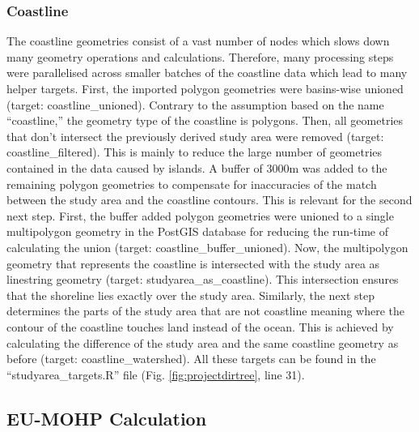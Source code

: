 \documentclass[fleqn,10pt]{wlscirep}
\begin{document}
\hypertarget{coastline}{%
\subsubsection*{Coastline}\label{coastline}}

The coastline geometries consist of a vast number of nodes which slows down many geometry operations and calculations. Therefore, many processing steps were parallelised across smaller batches of the coastline data which lead to many helper targets. First, the imported polygon geometries were basins-wise unioned (target: coastline\_unioned). Contrary to the assumption based on the name ``coastline,'' the geometry type of the coastline is polygons. Then, all geometries that don't intersect the previously derived study area were removed (target: coastline\_filtered). This is mainly to reduce the large number of geometries contained in the data caused by islands. A buffer of 3000m was added to the remaining polygon geometries to compensate for inaccuracies of the match between the study area and the coastline contours. This is relevant for the second next step. First, the buffer added polygon geometries were unioned to a single multipolygon geometry in the PostGIS database for reducing the run-time of calculating the union (target: coastline\_buffer\_unioned). Now, the multipolygon geometry that represents the coastline is intersected with the study area as linestring geometry (target: studyarea\_as\_coastline). This intersection ensures that the shoreline lies exactly over the study area. Similarly, the next step determines the parts of the study area that are not coastline meaning where the contour of the coastline touches land instead of the ocean. This is achieved by calculating the difference of the study area and the same coastline geometry as before (target: coastline\_watershed). All these targets can be found in the ``studyarea\_targets.R'' file (Fig. \ref{fig:projectdirtree}, line 31).

\hypertarget{eu-mohp-calculation}{%
\subsection*{EU-MOHP Calculation}\label{eu-mohp-calculation}}
\end{document}
